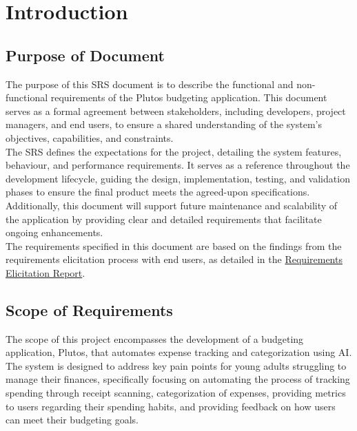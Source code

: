 \documentclass[12pt]{article}
\begin{document}
\section{Introduction}


\subsection{Purpose of Document}

The purpose of this SRS document is to describe the functional and
non-functional requirements of the Plutos budgeting application. This document
serves as a formal agreement between stakeholders, including developers, project
managers, and end users, to ensure a shared understanding of the system's
objectives, capabilities, and constraints. \\

\noindent The SRS defines the expectations for the project, detailing the system
features, behaviour, and performance requirements. It serves as a reference
throughout the development lifecycle, guiding the design, implementation,
testing, and validation phases to ensure the final product meets the agreed-upon
specifications. Additionally, this document will support future maintenance and
scalability of the application by providing clear and detailed requirements that
facilitate ongoing enhancements.\\

\noindent The requirements specified in this document are based on the findings
from the requirements elicitation process with end users, as detailed in the
\href{https://github.com/PlutosCapstone/Plutos/tree/main/docs/Extras/RequirementsElicitationReport.pdf}{Requirements
Elicitation Report}.

\subsection{Scope of Requirements} 

The scope of this project encompasses the development of a budgeting application, Plutos, that automates expense tracking 
and categorization using AI. The system is designed to address key pain points for young adults struggling to manage their 
finances, specifically focusing on automating the process of tracking spending through receipt scanning, categorization of 
expenses, providing metrics to users regarding their spending habits, and providing feedback on how users can meet their 
budgeting goals.\\
\end{document}
